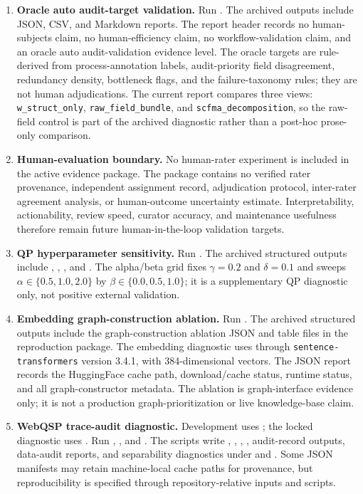 \documentclass[pdflatex,sn-mathphys-num]{sn-jnl}
\begin{document}
\begin{enumerate}
\item \textbf{Oracle auto audit-target validation.} Run . The archived outputs include JSON, CSV, and Markdown reports. The report header records no human-subjects claim, no human-efficiency claim, no workflow-validation claim, and an oracle auto audit-validation evidence level. The oracle targets are rule-derived from process-annotation labels, audit-priority field disagreement, redundancy density, bottleneck flags, and the failure-taxonomy rules; they are not human adjudications. The current report compares three views: \texttt{w\_struct\_only}, \texttt{raw\_field\_bundle}, and \texttt{scfma\_decomposition}, so the raw-field control is part of the archived diagnostic rather than a post-hoc prose-only comparison.
\item \textbf{Human-evaluation boundary.} No human-rater experiment is included in the active evidence package. The package contains no verified rater provenance, independent assignment record, adjudication protocol, inter-rater agreement analysis, or human-outcome uncertainty estimate. Interpretability, actionability, review speed, curator accuracy, and maintenance usefulness therefore remain future human-in-the-loop validation targets.
\item \textbf{QP hyperparameter sensitivity.} Run . The archived structured outputs include , , , and . The alpha/beta grid fixes $\gamma=0.2$ and $\delta=0.1$ and sweeps $\alpha \in \{0.5,1.0,2.0\}$ by $\beta \in \{0.0,0.5,1.0\}$; it is a supplementary QP diagnostic only, not positive external validation.
\item \textbf{Embedding graph-construction ablation.} Run . The archived structured outputs include the graph-construction ablation JSON and table files in the reproduction package. The embedding diagnostic uses  through \texttt{sentence-transformers} version 3.4.1, with 384-dimensional vectors. The JSON report records the HuggingFace cache path, download/cache status, runtime status, and all graph-constructor metadata. The ablation is graph-interface evidence only; it is not a production graph-prioritization or live knowledge-base claim.
\item \textbf{WebQSP trace-audit diagnostic.} Development uses ; the locked diagnostic uses . Run , , and . The scripts write , , , , audit-record outputs, data-audit reports, and separability diagnostics under  and . Some JSON manifests may retain machine-local cache paths for provenance, but reproducibility is specified through repository-relative inputs and scripts.

\end{enumerate}
\end{document}

